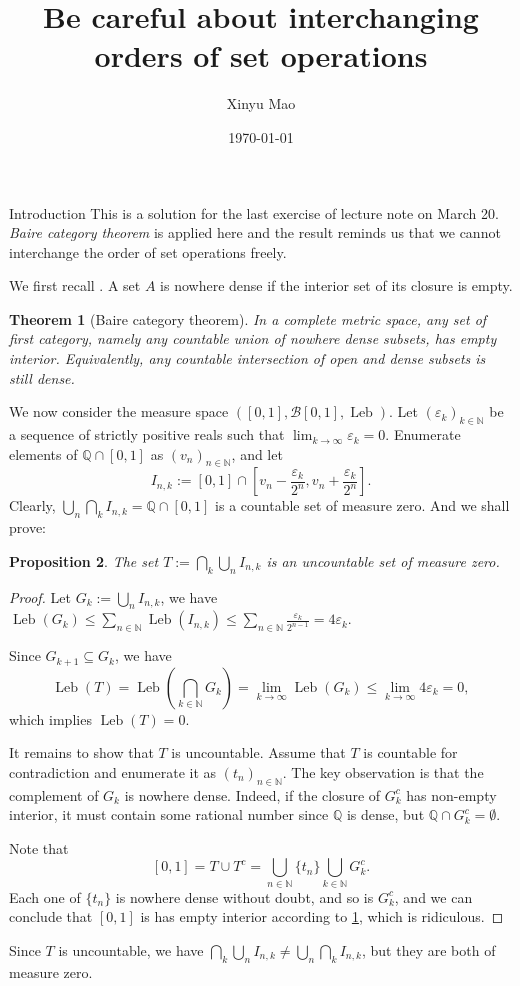 \documentclass[12pt]{article}
\title{Be careful about interchanging orders of set operations}
\author{Xinyu Mao}
\date{\today}
\newtheorem{theorem}{Theorem}
\newtheorem{proposition}[theorem]{Proposition}
\newcommand\Q{\mathbb{Q}}
\newcommand\N{\mathbb{N}}
\newcommand\bb{\mathcal{B}}
\newcommand\eps{\varepsilon}
\DeclareMathOperator{\leb}{Leb}
\begin{document}
\maketitle

\begin{tcolorbox}
\begin{paragraph}{Introduction}
    This is a solution for the last exercise of
    lecture note on March 20.
    \textit{Baire category theorem} is applied here 
    and the result reminds us that 
    we cannot interchange the order of set operations freely.
\end{paragraph}
\end{tcolorbox}

We first recall .
A set $A$ is nowhere dense if the interior set of its closure is empty.
\begin{theorem}[Baire category theorem]\label{baire}
In a complete metric space, any set of first category,
namely any countable union of nowhere dense subsets, has empty interior. Equivalently,
any countable intersection of open and dense subsets is still dense.
\end{theorem}   

We now consider the measure space $([0,1],\bb[0,1],\leb)$.
Let $(\eps_k)_{k \in \N}$ be a sequence of strictly positive reals 
such that $\lim_{k \to \infty} \eps_k = 0$. Enumerate 
elements of $\Q \cap [0,1]$ as $(v_n)_{n \in \N}$, and let 
$$
    I_{n,k} := [0,1] \cap [v_n - \frac{\eps_k}{2^n}, v_n + \frac{\eps_k}{2^n}].
$$
Clearly, $\bigcup_n \bigcap_k I_{n,k} = \Q \cap [0,1]$
is a countable set of measure zero. 
And we shall prove:

\begin{proposition}
    The set $T:= \bigcap_k \bigcup_n I_{n,k}$ is an uncountable set of measure zero.
\end{proposition}
\begin{proof}
Let $G_k := \bigcup_n I_{n,k}$, we have 
$\leb(G_k) \leq \sum_{n \in \N} \leb(I_{n,k}) \leq 
\sum_{n \in \N} \frac{\eps_k}{2^{n-1}} = 4\eps_{k}$.

Since $G_{k+1} \subseteq G_k$, we have
$$
\leb(T) = \leb(\bigcap_{k \in \N} G_k) 
= \lim_{k \to \infty} \leb(G_k) \leq \lim_{k \to \infty} 4\eps_{k} = 0,
$$ 
which implies $\leb(T) = 0$.

It remains to show that $T$ is uncountable.
Assume that $T$ is countable for contradiction 
and enumerate it as $(t_n)_{n \in \N}$.
The key observation is that the complement of $G_k$ is nowhere dense.
Indeed, if the closure of $G_k^c$ has non-empty interior,
it must contain some rational number since $\Q$ is dense,
but $\Q \cap G_k^c = \emptyset$.

Note that 
$$
    [0,1] = T \cup T^c = \bigcup_{n \in \N}\{t_n\} \bigcup_{k \in \N} G_k^c. 
$$
Each one of $\{t_n\}$ is nowhere dense without doubt, and so is $G_k^c$,
and we can conclude that $[0,1]$ is has empty interior according to
\cref{baire}, which is ridiculous.
\end{proof}
Since $T$ is uncountable, we have
 $\bigcap_k \bigcup_n I_{n,k} \neq \bigcup_n \bigcap_k I_{n,k}$,
 but they are both of measure zero.
\end{document}
